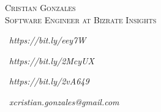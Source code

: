 \documentclass{res}
\begin{document}
\begin{resume}

\begin{center}
\textsc{{\Huge Cristian Gonzales}}\\
\vspace{1mm}
\textsc{\large Software Engineer at Bizrate Insights}\\
\vspace{1mm}
\end{center}

\begin{multicols}{4}
\begin{center}
\faLinkedinSquare\ 
\textit{https://bit.ly/eey7W}
\end{center}
\columnbreak
\begin{center}
\faGithub\ 
\textit{https://bit.ly/2McyUX}
\end{center}
\columnbreak
\begin{center}
\faGlobe\ 
\textit{https://bit.ly/2vA649}
\end{center}
\columnbreak
\faEnvelope\ 
\textit{xcristian.gonzales@gmail.com}
\end{multicols}

\vspace{-3mm}


\end{resume}
\end{document}
